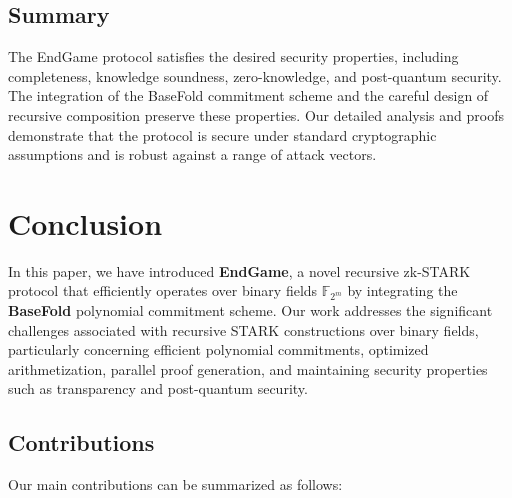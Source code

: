 \documentclass{article}
\theoremstyle{plain}
\theoremstyle{definition}
\theoremstyle{remark}
\theoremstyle{problem}
\begin{document}
\subsection{Summary}

The EndGame protocol satisfies the desired security properties, including completeness, knowledge soundness, zero-knowledge, and post-quantum security. The integration of the BaseFold commitment scheme and the careful design of recursive composition preserve these properties. Our detailed analysis and proofs demonstrate that the protocol is secure under standard cryptographic assumptions and is robust against a range of attack vectors.


\section{Conclusion}

In this paper, we have introduced \textbf{EndGame}, a novel recursive zk-STARK protocol that efficiently operates over binary fields $\mathbb{F}_{2^m}$ by integrating the \textbf{BaseFold} polynomial commitment scheme. Our work addresses the significant challenges associated with recursive STARK constructions over binary fields, particularly concerning efficient polynomial commitments, optimized arithmetization, parallel proof generation, and maintaining security properties such as transparency and post-quantum security.

\subsection{Contributions}

Our main contributions can be summarized as follows:
\end{document}
